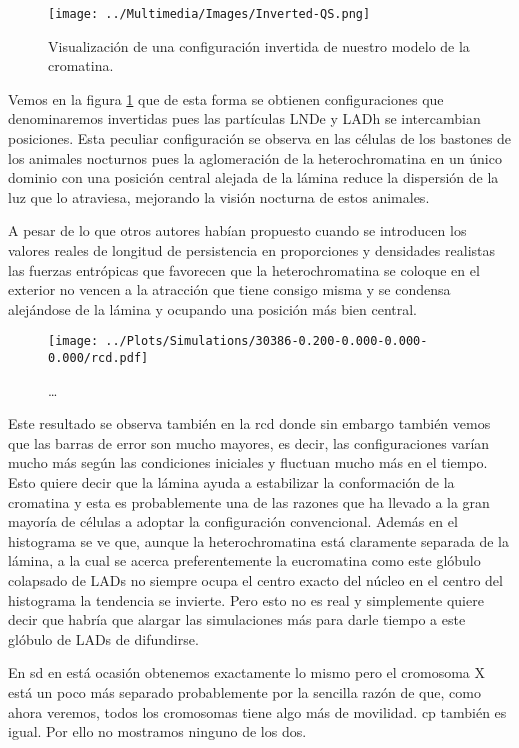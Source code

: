 \begin{figure}
    \centering
    \texttt{[image: ../Multimedia/Images/Inverted-QS.png]}
    \caption{Visualización de una configuración invertida de nuestro modelo de la cromatina.}
    \label{fig:vmd_QS_image_i}
\end{figure}

Vemos en la figura \ref{fig:vmd_QS_image_i} que de esta forma se obtienen configuraciones que denominaremos invertidas pues las partículas LNDe y LADh se intercambian posiciones. Esta peculiar configuración se observa en las células de los bastones de los animales nocturnos pues la aglomeración de la heterochromatina en un único dominio con una posición central alejada de la lámina reduce la dispersión de la luz que lo atraviesa, mejorando la visión nocturna de estos animales.

A pesar de lo que otros autores habían propuesto \cite{Finan2010} cuando se introducen los valores reales de longitud de persistencia en proporciones y densidades realistas las fuerzas entrópicas que favorecen que la heterochromatina se coloque en el exterior no vencen a la atracción que tiene consigo misma y se condensa alejándose de la lámina y ocupando una posición más bien central.

\begin{figure}
    \centering
    \texttt{[image: ../Plots/Simulations/30386-0.200-0.000-0.000-0.000/rcd.pdf]}
    \caption{\dots}
    \label{fig:rcd_i}
\end{figure}

Este resultado se observa también en la rcd donde sin embargo también vemos que las barras de error son mucho mayores, es decir, las configuraciones varían mucho más según las condiciones iniciales y fluctuan mucho más en el tiempo. Esto quiere decir que la lámina ayuda a estabilizar la conformación de la cromatina y esta es probablemente una de las razones que ha llevado a la gran mayoría de células a adoptar la configuración convencional. Además en el histograma se ve que, aunque la heterochromatina está claramente separada de la lámina, a la cual se acerca preferentemente la eucromatina como este glóbulo colapsado de LADs no siempre ocupa el centro exacto del núcleo en el centro del histograma la tendencia se invierte. Pero esto no es real y simplemente quiere decir que habría que alargar las simulaciones más para darle tiempo a este glóbulo de LADs de difundirse.

En sd en está ocasión obtenemos exactamente lo mismo pero el cromosoma X está un poco más separado probablemente por la sencilla razón de que, como ahora veremos, todos los cromosomas tiene algo más de movilidad. cp también es igual. Por ello no mostramos ninguno de los dos.

